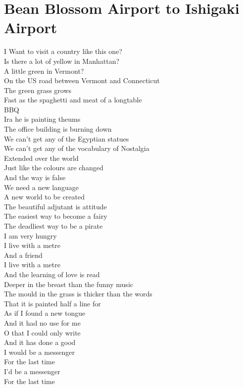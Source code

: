 \documentclass[smalldemyvopaper,11pt,twoside,onecolumn,openright,extrafontsizes]{memoir}
\begin{document}
\chapter{Bean Blossom Airport to Ishigaki Airport}
I         Want to visit a country like this one?
\\Is there a lot of yellow in Manhattan?
\\A little green in Vermont?
\\On the US road between Vermont and Connecticut
\\The green grass grows
\\Fast as the spaghetti and meat of a longtable
\\BBQ
\\Ira he is painting theums
\\The office building is burning down
\\We can't get any of the Egyptian statues
\\We can't get any of the vocabulary of Nostalgia
\\Extended over the world
\\Just like the colours are changed
\\And the way is false
\\We need a new language
\\A new world to be created
\\The beautiful adjutant is attitude
\\The easiest way to become a fairy
\\The deadliest way to be a pirate
\\I am very hungry
\\I live with a metre
\\And a friend
\\I live with a metre
\\And the learning of love is read
\\Deeper in the breast than the funny music
\\The mould in the grass is thicker than the words
\\That it is painted half a line for
\\As if I found a new tongue
\\And it had no use for me
\\O that I could only write
\\And it has done a good
\\I would be a messenger
\\For the last time
\\I'd be a messenger
\\For the last time
\end{document}
